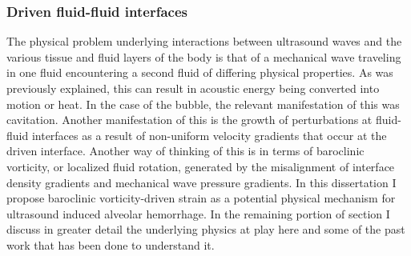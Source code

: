 \subsubsection{Driven fluid-fluid interfaces}
The physical problem underlying interactions between ultrasound waves
and the various tissue and fluid layers of the body is that of a
mechanical wave traveling in one fluid encountering a second fluid of
differing physical properties. As was previously explained, this can
result in acoustic energy being converted into motion or heat. In the
case of the bubble, the relevant manifestation of this was
cavitation. Another manifestation of this is the growth of
perturbations at fluid-fluid interfaces as a result of non-uniform
velocity gradients that occur at the driven interface. Another way of
thinking of this is in terms of baroclinic vorticity, or localized
fluid rotation, generated by the misalignment of interface density
gradients and mechanical wave pressure gradients. In this dissertation
I propose baroclinic vorticity-driven strain as a potential physical
mechanism for ultrasound induced alveolar hemorrhage. In the
remaining portion of section I discuss in greater detail the
underlying physics at play here and some of the past work that has
been done to understand it.

